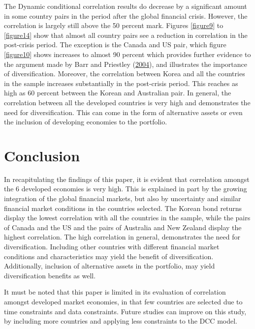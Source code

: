 \documentclass[11pt,preprint, authoryear]{elsarticle}
\numberwithin{equation}{section}
\numberwithin{figure}{section}
\numberwithin{table}{section}
\begin{document}
The Dynamic conditional correlation results do decrease by a significant
amount in some country pairs in the period after the global financial
crisis. However, the correlation is largely still above the 50 percent
mark. Figures \ref{figure9} to \ref{figure14} show that almost all
country pairs see a reduction in correlation in the post-crisis period.
The exception is the Canada and US pair, which figure \ref{figure10}
shows increases to almost 90 percent which provides further evidence to
the argument made by Barr and Priestley
(\protect\hyperlink{ref-barr2004}{2004}), and illustrates the importance
of diversification. Moreover, the correlation between Korea and all the
countries in the sample increases substantially in the post-crisis
period. This reaches as high as 60 percent between the Korean and
Australian pair. In general, the correlation between all the developed
countries is very high and demonstrates the need for diversification.
This can come in the form of alternative assets or even the inclusion of
developing economies to the portfolio.

\section{\texorpdfstring{Conclusion
\label{conclusion}}{Conclusion }}\label{conclusion}

In recapitulating the findings of this paper, it is evident that
correlation amongst the 6 developed economies is very high. This is
explained in part by the growing integration of the global financial
markets, but also by uncertainty and similar financial market conditions
in the countries selected. The Korean bond returns display the lowest
correlation with all the countries in the sample, while the pairs of
Canada and the US and the pairs of Australia and New Zealand display the
highest correlation. The high correlation in general, demonstrates the
need for diversification. Including other countries with different
financial market conditions and characteristics may yield the benefit of
diversification. Additionally, inclusion of alternative assets in the
portfolio, may yield diversification benefits as well.

It must be noted that this paper is limited in its evaluation of
correlation amongst developed market economies, in that few countries
are selected due to time constraints and data constraints. Future
studies can improve on this study, by including more countries and
applying less constraints to the DCC model.
\end{document}
